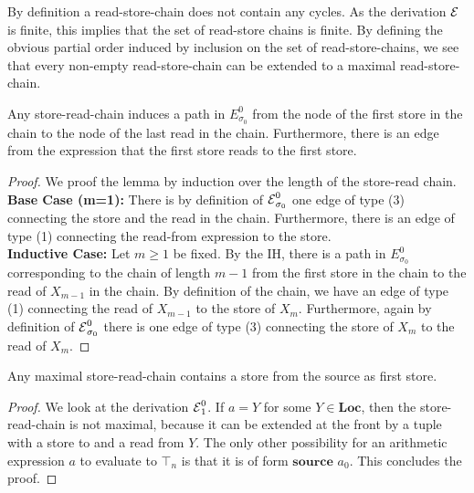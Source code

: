 \begin{remark}
    By definition a read-store-chain does not contain any cycles.
    As the derivation $\operatorname{\mathcal{E}}$ is finite, this implies that the set of 
    read-store chains is finite.
    By defining the obvious partial order induced by inclusion
    on the set of read-store-chains, we see that 
    every non-empty read-store-chain can be extended to a maximal 
    read-store-chain.
\end{remark}

\begin{lemma}
    \label{lem:chain-to-graph}
    Any store-read-chain induces a path in $E^0_{\sigma_0}$ from the node 
    of the first store in the chain to the node of the last read in the chain.
    Furthermore, there is an edge from the expression that the first store reads
    to the first store.
\end{lemma}
\begin{proof}
    We proof the lemma by induction over the length of the store-read chain.\\
    \textbf{Base Case (m=1):}
    There is by definition of $\operatorname{\mathcal{E}}^0_{\sigma_0}$
    one edge of type (3) connecting the store and the read in the chain.
    Furthermore, there is an edge of type (1) connecting the read-from expression
    to the store.\\
    \textbf{Inductive Case:}
    Let $m \geq 1$ be fixed. By the IH, there is a path in $E^0_{\sigma_0}$
    corresponding to the chain of length $m-1$ from the first store in the chain 
    to the read of $X_{m-1}$ in the chain.
    By definition of the chain, we have an edge of type (1) connecting 
    the read of $X_{m-1}$ to the store of $X_m$.
    Furthermore, again by definition of $\operatorname{\mathcal{E}}^0_{\sigma_0}$
    there is one edge of type (3) connecting the store of $X_m$ to the
    read of $X_m$.
\end{proof}

\begin{lemma}
    \label{lem:max-store-read}
    Any maximal store-read-chain contains a store from the source as first store.
\end{lemma}
\begin{proof}
    We look at the derivation $\operatorname{\mathcal{E}}^0_1$.
    If $a = Y$ for some $Y \in \textbf{Loc}$, then the store-read-chain is not 
    maximal, because it can be extended at the front by a tuple with a store to and a
    read from $Y$.
    The only other possibility for an arithmetic expression $a$ to evaluate to 
    $\top_n$ is that it is of form $\textbf{source } a_0$.
    This concludes the proof.
\end{proof}


